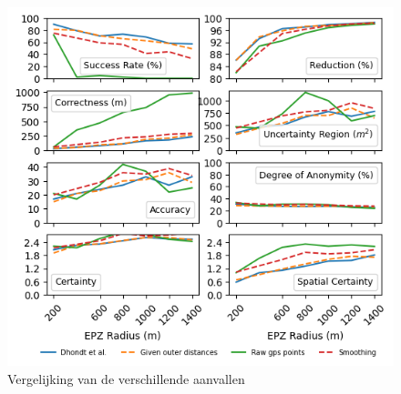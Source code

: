 \begin{figure}[h]
    \centering
    \includegraphics[width=\textwidth]{fig/result_graphs/all_results.png}
    \caption{Vergelijking van de verschillende aanvallen}\label{fig:attack_comparison}
\end{figure}